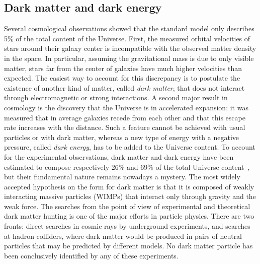 \subsection*{Dark matter and dark energy}

Several cosmological observations showed that the standard model only describes 5\% of the total content of the Universe.
First, the measured orbital velocities of stars around their galaxy center is incompatible with the observed matter density in the space.
In particular, assuming the gravitational mass is due to only visible matter, stars far from the center of galaxies have much higher velocities than expected. %
The easiest way to account for this discrepancy is to postulate the existence of another kind of matter, called \textit{dark matter}, that does not interact through electromagnetic or strong interactions.
A second major result in cosmology is the discovery that the Universe is in accelerated expansion: it was measured that in average galaxies recede from each other and that this escape rate increases with the distance.
Such a feature cannot be achieved with usual particles or with dark matter, whereas a new type of energy with a negative pressure, called \textit{dark energy}, has to be added to the Universe content.
To account for the experimental observations, dark matter and dark energy have been estimated to compose respectively 26\% and 69\% of the total Universe content~\cite{Ade:2015xua}, but their fundamental nature remains nowadays a mystery.
The most widely accepted hypothesis on the form for dark matter is that it is composed of weakly interacting massive particles (WIMPs) that interact only through gravity and the weak force.
The searches from the point of view of experimental and theoretical dark matter hunting is one of the major efforts in particle physics.
There are two fronts: direct searches in cosmic rays by underground experiments, and searches at hadron colliders, where dark matter would be produced in pairs of neutral particles that may be predicted by different models.
No dark matter particle has been conclusively identified by any of these experiments.

